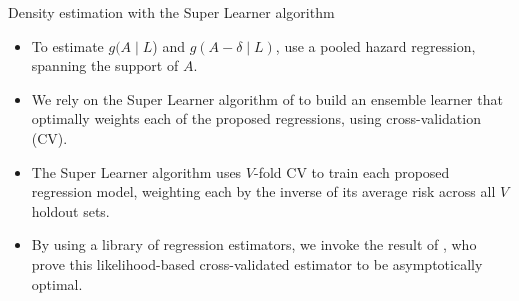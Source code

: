 \documentclass{beamer}
\begin{document}
\begin{frame}[c]{Density estimation with the Super Learner algorithm}

\begin{center}
\begin{itemize}
  \itemsep10pt
  \item To estimate $g(A \mid L$) and $g(A - \delta \mid L)$, use a pooled
    hazard regression, spanning the support of $A$.
  \item We rely on the Super Learner algorithm of \cite{vdl2007super} to build
    an ensemble learner that optimally weights each of the proposed regressions,
    using cross-validation (CV).
  \item The Super Learner algorithm uses $V$-fold CV to train each proposed
    regression model, weighting each by the inverse of its average risk across
    all $V$ holdout sets.
  \item By using a library of regression estimators, we invoke the result of
    \cite{vdl2004asymptotic}, who prove this likelihood-based cross-validated
    estimator to be asymptotically optimal.
\end{itemize}
\end{center}


\end{frame}

\end{document}
